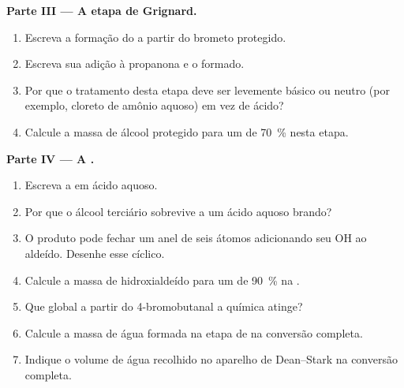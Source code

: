 \begin{problem}
\medskip
\noindent\textbf{Parte III --- A etapa de Grignard.}
\begin{enumerate}[resume]
  \item Escreva a formação do  a partir do brometo
        protegido.
  \item Escreva sua adição à propanona e o  formado.
  \item Por que o tratamento desta etapa deve ser levemente básico ou
        neutro (por exemplo, cloreto de amônio aquoso) em vez de ácido?
  \item Calcule a massa de álcool protegido para um  de
        \qty{70}{\percent} nesta etapa.
\end{enumerate}

\medskip
\noindent\textbf{Parte IV --- A .}
\begin{enumerate}[resume]
  \item Escreva a  em ácido aquoso.
  \item Por que o álcool terciário sobrevive a um ácido aquoso brando?
  \item O produto pode fechar um anel de seis átomos adicionando seu OH ao
        aldeído. Desenhe esse  cíclico.
  \item Calcule a massa de hidroxialdeído para um  de
        \qty{90}{\percent} na .
  \item Que  global a partir do 4-bromobutanal a química atinge?
  \item Calcule a massa de água formada na etapa de  na
        conversão completa.
  \item Indique o volume de água recolhido no aparelho de Dean--Stark na
        conversão completa.
\end{enumerate}
\end{problem}
